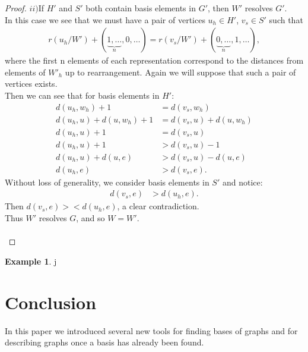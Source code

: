 \documentclass[11pt]{amsart}
\theoremstyle{plain}  %
\theoremstyle{definition}
\newtheorem{ex}[thm]{Example}
\theoremstyle{remark}
\numberwithin{equation}{thm}
\begin{document}
\begin{proof}
$ii)$If $H'$ and $S'$ both contain basis elements in $G'$, then $W'$ resolves $G'$.\\ 
In this case we see that we must have a pair of vertices $u_h \in H'$, $v_s\in S'$ such that
\begin{align*}
 r(u_h/W') + (\underbrace{1,\dots}_{n},0,\dots) = r(v_s/W') + (\underbrace{0,\dots}_{n},1,\dots),
\end{align*}
where the first n elements of each representation correspond to the distances from elements of $W'_h$ up to rearrangement. 
Again we will suppose that such a pair of vertices exists.\\ 
Then we can see that for basis elements in $H'$:
\begin{align*}
d(u_h, w_h) + 1 &= d(v_s,w_h)\\
d(u_h, u) + d(u, w_h) + 1 &= d(v_s, u) + d(u, w_h)\\
d(u_h, u) + 1 &= d(v_s, u)\\
d(u_h, u) + 1 &> d(v_s, u) - 1\\
d(u_h, u) + d(u, e) &> d(v_s, u) - d(u, e)\\
d(u_h, e) &> d(v_s, e).
\end{align*}
Without loss of generality, we consider basis elements in $S'$ and notice:
\begin{align*}
 d(v_s, e) &> d(u_h, e).
\end{align*}
Then $d(v_s, e) >< d(u_h, e)$, a clear contradiction.\\
Thus $W'$ resolves $G$, and so $W = W'$.\\ \\
\end{proof}


\begin{ex}
 j
\end{ex}





\section{Conclusion}
In this paper we introduced several new tools for finding bases of graphs and for describing graphs once a basis has already been found.
\cite{Chartrand:2010:GDF:1941879}

\nocite{*}

\end{document}
